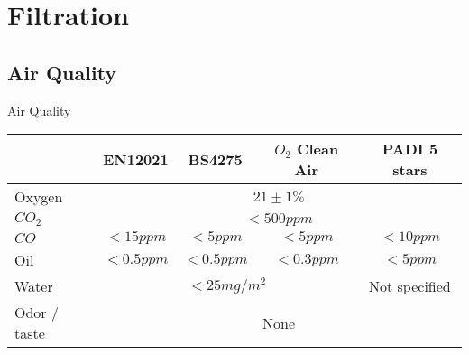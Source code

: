 \documentclass[aspectratio=1610,english,12pt]{beamer}
\begin{document}
%


\section{Filtration}

\subsection{Air Quality}

\begin{frame}{Air Quality}
	\begin{tabularx}{\linewidth}{|X|c|c|c|c|}
		\hline	& EN12021 & BS4275 & $O_2$ Clean Air & PADI 5 stars \\ \hline
		Oxygen 	& \multicolumn{4}{c|}{$21 \pm 1\%$}\\ \hline
		$CO_2$	& \multicolumn{4}{c|}{$<500ppm$}\\ \hline
		$CO$		& $<15ppm$	& $<5ppm$	& $<5ppm$	& $<10ppm$\\ \hline
		Oil		& $<0.5ppm$	& $<0.5ppm$	& $<0.3ppm$	& $<5ppm$\\ \hline
		Water	& \multicolumn{3}{c|}{$<25mg/m^2$} & Not specified \\ \hline
		Odor / taste			& \multicolumn{4}{c|}{None}\\ \hline	
	\end{tabularx}
\end{frame}
\end{document}

